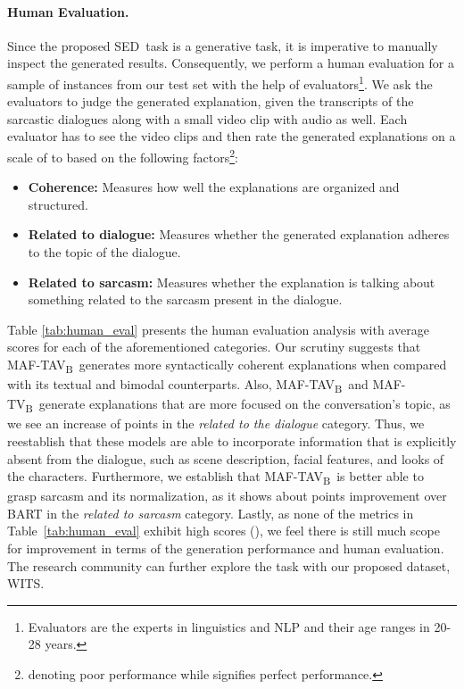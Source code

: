 \documentclass[11pt]{article}
\newcommand{\dataset}{\textsc{WITS}}
\newcommand{\modelTV}{\textsc{MAF-TV\textsubscript{B}}}
\newcommand{\modelTAV}{\textsc{MAF-TAV\textsubscript{B}}}
\newcommand{\task}{\textsc{SED}}
\begin{document}
\paragraph{Human Evaluation.}
Since the proposed \task\ task is a generative task, it is imperative to manually inspect the generated results. Consequently, we perform a human evaluation for a sample of  instances from our test set with the help of  evaluators\footnote{Evaluators are the experts in linguistics and NLP and their age ranges in 20-28 years.}. We ask the evaluators to judge the generated explanation, given the transcripts of the sarcastic dialogues along with a small video clip with audio as well. Each evaluator has to see the video clips and then rate the generated explanations on a scale of  to  based on the following factors\footnote{ denoting poor performance while  signifies perfect performance.}:
\begin{itemize}[leftmargin=*,topsep=0pt]
\setlength{\itemsep}{0pt}
\setlength{\parskip}{0pt}
\setlength{\parsep}{0pt}
    \item \textbf{Coherence:} Measures how well the explanations are organized and structured.
    \item \textbf{Related to dialogue:} Measures whether the generated explanation adheres to the topic of the dialogue.
    \item \textbf{Related to sarcasm:} Measures whether the explanation is talking about something related to the sarcasm present in the dialogue.
\end{itemize}
Table \ref{tab:human_eval} presents the human evaluation analysis with average scores for each of the aforementioned categories. Our scrutiny suggests that \modelTAV\ generates more syntactically coherent explanations when compared with its textual and bimodal counterparts. Also, \modelTAV\ and \modelTV\ generate explanations that are more focused on the conversation's topic, as we see an increase of  points in the \textit{related to the dialogue} category. Thus, we reestablish that these models are able to incorporate information that is explicitly absent from the dialogue, such as scene description, facial features, and looks of the characters. Furthermore, we establish that \modelTAV\ is better able to grasp sarcasm and its normalization, as it shows about  points improvement over BART in the \textit{related to sarcasm} category. Lastly, as none of the metrics in Table~\ref{tab:human_eval} exhibit high scores (), we feel there is still much scope for improvement in terms of the generation performance and human evaluation. The research community can further explore the task with our proposed dataset, \dataset.
\end{document}
